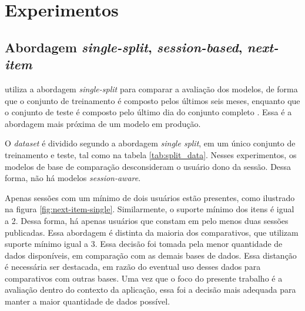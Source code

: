   \newpage
  \section{Experimentos} 


\subsection{Abordagem \textit{single-split}, \textit{session-based}, \textit{next-item}}

\citet{HidasiKBT15} utiliza a abordagem \textit{single-split} para comparar a
avaliação dos modelos, de forma que o conjunto de treinamento é composto pelos
últimos seis meses, enquanto que o conjunto de teste é composto pelo último dia
do conjunto completo \cite{ludewig_2018}. Essa é a abordagem mais próxima de um
modelo em produção.

O \textit{dataset} é dividido segundo a abordagem \textit{single split}, em um
único conjunto de treinamento e teste, tal como na tabela
\ref{tab:split_data}. Nesses experimentos, os modelos de base de comparação
desconsideram o usuário dono da sessão. Dessa forma, não há modelos
\textit{session-aware}.

Apenas sessões com um mínimo de dois usuários estão presentes, como ilustrado na
figura \ref{fig:next-item-single}. Similarmente, o suporte mínimo dos itens é
igual a 2. Dessa forma, há apenas usuários que constam em pelo menos duas
sessões publicadas. Essa abordagem é distinta da maioria dos comparativos, que
utilizam suporte mínimo igual a 3. Essa decisão foi tomada pela menor quantidade
de dados disponíveis, em comparação com as demais bases de dados. Essa distanção
é necessária ser destacada, em razão do eventual uso desses dados
para comparativos com outras bases. Uma vez que o foco do presente trabalho é a
avaliação dentro do contexto da aplicação, essa foi a decisão mais adequada para
manter a maior quantidade de dados possível.

